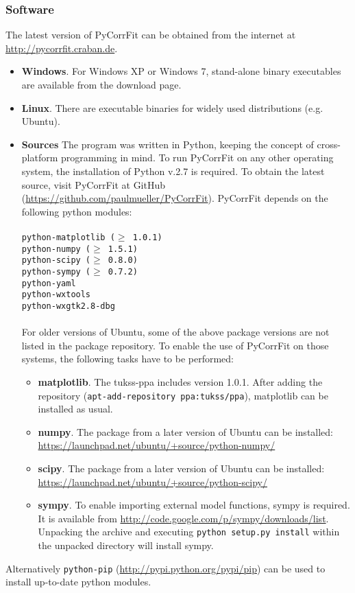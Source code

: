 \subsubsection{Software}
\label{cha:soft}
The latest version of PyCorrFit can be obtained from the internet at \url{http://pycorrfit.craban.de}.
\begin{itemize}
\item \textbf{Windows}.
For Windows XP or Windows 7, stand-alone binary executables are available from the download page. 
\item \textbf{Linux}.
There are executable binaries for widely used distributions (e.g. Ubuntu).
\item \textbf{Sources}
The program was written in Python, keeping the concept of cross-platform programming in mind. To run PyCorrFit on any other operating system, the installation of Python v.2.7 is required. To obtain the latest source, visit PyCorrFit at GitHub (\url{https://github.com/paulmueller/PyCorrFit}). PyCorrFit depends on the following python modules:\\
\texttt{\\
python-matplotlib ($\geq$ 1.0.1) \\
python-numpy ($\geq$ 1.5.1) \\
python-scipy ($\geq$ 0.8.0) \\
python-sympy ($\geq$ 0.7.2) \\
python-yaml \\
python-wxtools \\
python-wxgtk2.8-dbg \\
}
\\
For older versions of Ubuntu, some of the above package versions are not listed in the package repository. To enable the use of PyCorrFit on those systems, the following tasks have to be performed:
\begin{itemize}
\item[ ] \textbf{matplotlib}. The tukss-ppa includes version 1.0.1. After adding the repository (\texttt{apt-add-repository ppa:tukss/ppa}), matplotlib can be installed as usual.
\item[ ] \textbf{numpy}. The package from a later version of Ubuntu can be installed: \url{https://launchpad.net/ubuntu/+source/python-numpy/}
\item[ ] \textbf{scipy}. The package from a later version of Ubuntu can be installed: \url{https://launchpad.net/ubuntu/+source/python-scipy/}
\item[ ] \textbf{sympy}. To enable importing external model functions, sympy is required. It is available from \url{http://code.google.com/p/sympy/downloads/list}. Unpacking the archive and executing \texttt{python setup.py install} within the unpacked directory will install sympy.
\end{itemize}
\end{itemize}
Alternatively \texttt{python-pip} (\url{http://pypi.python.org/pypi/pip}) can be used to install up-to-date python modules.

